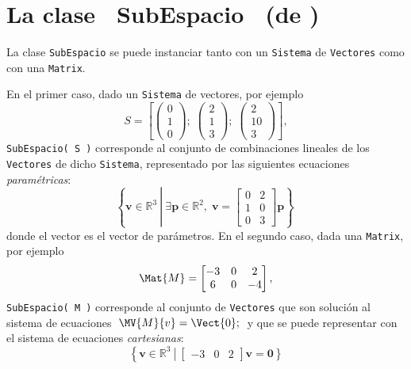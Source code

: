 \documentclass[11pt]{report}
\begin{document}
\section{La clase ~SubEspacio~ (de \R[m])} La clase \texttt{SubEspacio} se
puede instanciar tanto con un \texttt{Sistema} de \texttt{Vectores} como con una
\texttt{Matrix}.

En el primer caso, dado un \texttt{Sistema} de vectores, por ejemplo
\begin{displaymath}
  S=
  \left[
    \begin{pmatrix}0\\1\\0\end{pmatrix};\;
    \begin{pmatrix}2\\1\\3\end{pmatrix};\;
    \begin{pmatrix}2\\10\\3\end{pmatrix}
  \right],
\end{displaymath}
\texttt{SubEspacio( S )} corresponde al conjunto de combinaciones lineales de
los \texttt{Vectores} de dicho \texttt{Sistema}, representado por las siguientes
ecuaciones \emph{paramétricas}:
\begin{displaymath}
  \left\{ \boldsymbol{v}\in\mathbb{R}^3\ \left|\ \exists\boldsymbol{p}\in\mathbb{R}^2,\; \boldsymbol{v}= \begin{bmatrix}0&2\\1&0\\0&3\end{bmatrix}\boldsymbol{p}\right. \right\}\; 
\end{displaymath}
donde el vector  es el vector de parámetros.  En el segundo
caso, dada una \texttt{Matrix}, por ejemplo
\begin{displaymath}
  \;\Mat{M}=\begin{bmatrix}-3&0&2\\6&0&-4\end{bmatrix},\;
\end{displaymath}
\texttt{SubEspacio( M )} corresponde al conjunto de \texttt{Vectores} que son
solución al sistema de ecuaciones
\begin{math}
  \;\MV{M}{v}=\Vect{0};\;
\end{math}
y que se puede representar con el sistema de ecuaciones \emph{cartesianas}:
\begin{displaymath}
  \left\{
    \boldsymbol{v}\in\mathbb{R}^3\
    \left|
      \ \begin{bmatrix}-3&0&2\end{bmatrix}\boldsymbol{v}=\boldsymbol{0}
    \right\}
  \right.
\end{displaymath}
\end{document}
